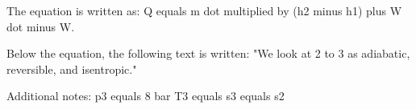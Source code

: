 The equation is written as:  
Q equals m dot multiplied by (h2 minus h1) plus W dot minus W.  

Below the equation, the following text is written:  
"We look at 2 to 3 as adiabatic, reversible, and isentropic."  

Additional notes:  
p3 equals 8 bar  
T3 equals  
s3 equals s2